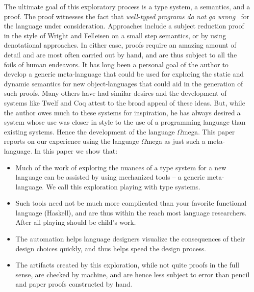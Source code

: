 \documentclass{sigplanconf}
\newcommand{\om}{$\Omega$mega}
\begin{document}
The ultimate goal of this exploratory process is a type system, a semantics,
and a proof. The proof witnesses the fact that {\em well-typed programs do not
go wrong}~\cite{Milner78} for the language under consideration. 
Approaches include a subject reduction proof in the style of
Wright and Felleisen\cite{Wright:94} on a small step semantics, or
by using denotational approaches. In either case, proofs require an amazing amount of
detail and are most often carried out by hand, and are thus subject to all the
foils of human endeavors. It has long been a personal goal of the author to
develop a generic meta-language that could be used for exploring the static
and dynamic semantics for new object-languages\cite{SheardPasalic2002,Sheard01} 
that could aid in the generation of such proofs. Many others have
had similar desires and the development of systems like
Twelf\cite{CADE99*202} and Coq\cite{COQ74} attest to the broad appeal of 
these ideas. But, while the author owes much to these systems for inspiration,
he has always desired a system whose use was closer in style
to the use of a programming language than existing systems. Hence the development of the language \om.
This paper reports on our experience using the
language \om\cite{Sheard:2004:LF,omegamanual,SheardLinger,SheardLogFrWks04} as
just such a meta-language. In this paper we show that:

\begin{itemize}

\item Much of the work of exploring the nuances of
a type system for a new language can be assisted by using mechanized tools 
-- a generic meta-language.
We call this exploration playing with type systems.

\item Such tools need not be much more complicated than your favorite
functional language (Haskell), and are thus within the reach most language researchers.
After all playing should be child's work.

\item The automation helps language designers visualize the consequences
of their design choices quickly, and thus helps speed the design process.

\item The artifacts created by this exploration, while
not quite proofs in the full sense, are checked by machine, 
and are hence less subject to error than pencil and paper proofs constructed
by hand.

\end{itemize}
\end{document}
